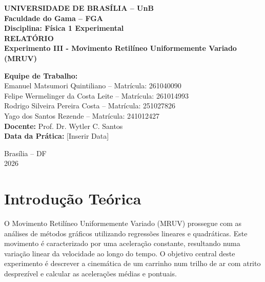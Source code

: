 \documentclass[12pt, a4paper]{article}
\begin{document}
\begin{center}
    \textbf{\Large UNIVERSIDADE DE BRASÍLIA -- UnB}\\
    \textbf{\large Faculdade do Gama -- FGA}\\
    \vspace{0.5cm}
    \textbf{\large Disciplina: Física 1 Experimental}\\
    \vspace{2.5cm}
    {\Large \textbf{RELATÓRIO}}\\
    \vspace{0.5cm}
    {\large \textbf{Experimento III - Movimento Retilíneo Uniformemente Variado (MRUV)}}\\
    \vspace{2.5cm}
\end{center}

\begin{flushright}
    \textbf{Equipe de Trabalho:}\\
    Emanuel Matsumori Quintiliano -- Matrícula: 261040090\\
    Felipe Wermelinger da Costa Leite -- Matrícula: 261014993\\
    Rodrigo Silveira Pereira Costa -- Matrícula: 251027826\\
    Yago dos Santos Rezende -- Matrícula: 241012427\\
    \vspace{0.8cm}
    \textbf{Docente:} Prof. Dr. Wytler C. Santos\\
    \textbf{Data da Prática:} [Inserir Data]
\end{flushright}

\vfill
\begin{center}
    Brasília -- DF \\
    2026
\end{center}

\newpage

\section{Introdução Teórica}
O Movimento Retilíneo Uniformemente Variado (MRUV) prossegue com as análises de métodos gráficos utilizando regressões lineares e quadráticas. Este movimento é caracterizado por uma aceleração constante, resultando numa variação linear da velocidade ao longo do tempo. O objetivo central deste experimento é descrever a cinemática de um carrinho num trilho de ar com atrito desprezível e calcular as acelerações médias e pontuais.
\end{document}
